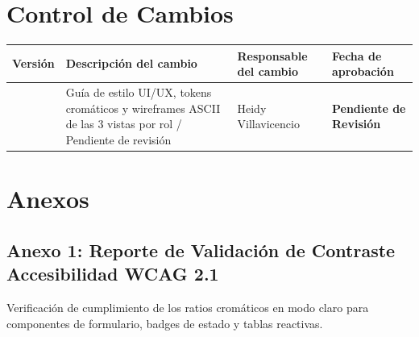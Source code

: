 \documentclass[12pt,a4paper]{article}
\begin{document}
\section{Control de Cambios}

\noindent
\renewcommand{\arraystretch}{1.2}
\begin{tabularx}{\textwidth}{|>{\hsize=0.45\hsize\centering\arraybackslash}X|>{\hsize=1.55\hsize\raggedright\arraybackslash}X|>{\hsize=1.2\hsize\raggedright\arraybackslash}X|>{\hsize=0.8\hsize\centering\arraybackslash}X|}
    \hline
    \rowcolor{gray!20}
    \textbf{Versión} & \textbf{Descripción del cambio} & \textbf{Responsable del cambio} & \textbf{Fecha de aprobación} \\
    \hline
    1.0 & Guía de estilo UI/UX, tokens cromáticos y wireframes ASCII de las 3 vistas por rol / Pendiente de revisión & Heidy Villavicencio & \textbf{\textcolor{gray!90}{Pendiente de Revisión}} \\
    \hline
\end{tabularx}

\vspace{0.4cm}

\section{Anexos}
\subsection*{Anexo 1: Reporte de Validación de Contraste Accesibilidad WCAG 2.1}
Verificación de cumplimiento de los ratios cromáticos en modo claro para componentes de formulario, badges de estado y tablas reactivas.
\end{document}
